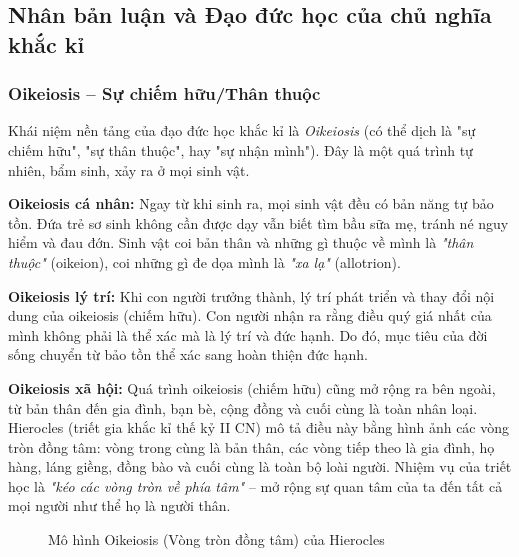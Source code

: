 \subsection{Nhân bản luận và Đạo đức học của chủ nghĩa khắc kỉ}

\subsubsection{Oikeiosis – Sự chiếm hữu/Thân thuộc}

Khái niệm nền tảng của đạo đức học khắc kỉ là \textit{Oikeiosis} (có thể dịch là "sự chiếm hữu", "sự thân thuộc", hay "sự nhận mình"). Đây là một quá trình tự nhiên, bẩm sinh, xảy ra ở mọi sinh vật.

\textbf{Oikeiosis cá nhân:} Ngay từ khi sinh ra, mọi sinh vật đều có bản năng tự bảo tồn. Đứa trẻ sơ sinh không cần được dạy vẫn biết tìm bầu sữa mẹ, tránh né nguy hiểm và đau đớn. Sinh vật coi bản thân và những gì thuộc về mình là \textit{"thân thuộc"} (oikeion), coi những gì đe dọa mình là \textit{"xa lạ"} (allotrion).

\textbf{Oikeiosis lý trí:} Khi con người trưởng thành, lý trí phát triển và thay đổi nội dung của oikeiosis (chiếm hữu). Con người nhận ra rằng điều quý giá nhất của mình không phải là thể xác mà là lý trí và đức hạnh. Do đó, mục tiêu của đời sống chuyển từ bảo tồn thể xác sang hoàn thiện đức hạnh.

\textbf{Oikeiosis xã hội:} Quá trình oikeiosis (chiếm hữu) cũng mở rộng ra bên ngoài, từ bản thân đến gia đình, bạn bè, cộng đồng và cuối cùng là toàn nhân loại. Hierocles (triết gia khắc kỉ thế kỷ II CN) mô tả điều này bằng hình ảnh các vòng tròn đồng tâm: vòng trong cùng là bản thân, các vòng tiếp theo là gia đình, họ hàng, láng giềng, đồng bào và cuối cùng là toàn bộ loài người. Nhiệm vụ của triết học là \textit{"kéo các vòng tròn về phía tâm"} – mở rộng sự quan tâm của ta đến tất cả mọi người như thể họ là người thân.

\begin{figure}[H]
    \centering
    \caption{Mô hình Oikeiosis (Vòng tròn đồng tâm) của Hierocles}
\end{figure}

